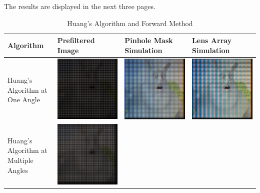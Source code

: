 The results are displayed in the next three pages.

\begin{table}[]
  \centering
     \caption{Huang's Algorithm and Forward Method}
    \begin{tabular}{| p{4 cm} | p{4cm} | p{4cm} | p{4cm} |}
    \hline Algorithm & Prefiltered Image & Pinhole Mask Simulation & Lens Array Simulation \\
    \hline Huang's Algorithm at One Angle & \includegraphics[width = 4 cm]{chapters/chapter9/images/simulation/Huang_1angle_prefilter.png} &
         \includegraphics[width = 4 cm]{chapters/chapter9/images/simulation/Huang_1angle_pinhole_simulation.png} &  
         \includegraphics[width = 4 cm]{chapters/chapter9/images/simulation/Huang_1angle_lens_simulation.png} \\
    \hline Huang's Algorithm at Multiple Angles & \includegraphics[width = 4 cm]{chapters/chapter9/images/simulation/Huang_allangle_prefilter.png} &

\end{tabular}
\end{table}
